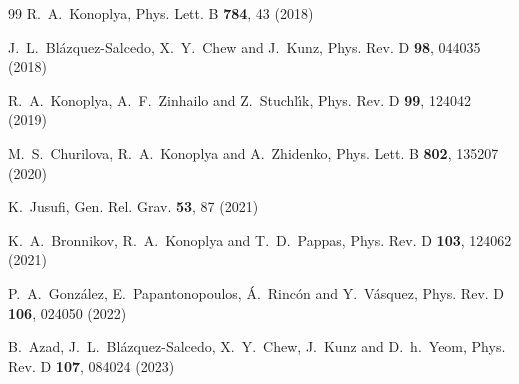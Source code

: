 \documentclass[11pt,a4paper]{article}
\begin{document}
\begin{thebibliography}{99}
R.~A.~Konoplya,
Phys. Lett. B \textbf{784}, 43 (2018)

J.~L.~Bl\'azquez-Salcedo, X.~Y.~Chew and J.~Kunz,
Phys. Rev. D \textbf{98}, 044035 (2018)

R.~A.~Konoplya, A.~F.~Zinhailo and Z.~Stuchl\'\i{}k,
Phys. Rev. D \textbf{99}, 124042 (2019)

M.~S.~Churilova, R.~A.~Konoplya and A.~Zhidenko,
Phys. Lett. B \textbf{802}, 135207 (2020)

K.~Jusufi,
Gen. Rel. Grav. \textbf{53}, 87 (2021)

K.~A.~Bronnikov, R.~A.~Konoplya and T.~D.~Pappas,
Phys. Rev. D \textbf{103}, 124062 (2021)

P.~A.~Gonz\'alez, E.~Papantonopoulos, \'A.~Rinc\'on and Y.~V\'asquez,
Phys. Rev. D \textbf{106}, 024050 (2022)

B.~Azad, J.~L.~Bl\'azquez-Salcedo, X.~Y.~Chew, J.~Kunz and D.~h.~Yeom,
Phys. Rev. D \textbf{107}, 084024 (2023)



\end{thebibliography}
\end{document}
